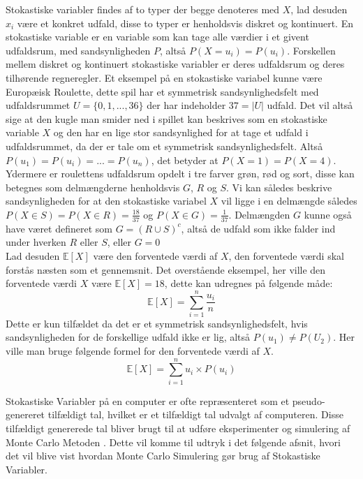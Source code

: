 \documentclass[../../SRP.tex]{subfiles}
\begin{document}
Stokastiske variabler findes af to typer der begge denoteres med $X$, lad desuden $x_i$ være et konkret udfald, disse to typer er henholdsvis diskret og kontinuert. En stokastiske variable er en variable som kan tage alle værdier i et givent udfaldsrum, med sandsynligheden $P$, altså $P(X = u_i) = P(u_i)$. Forskellen mellem diskret og kontinuert stokastiske variabler er deres udfaldsrum og deres tilhørende regneregler. Et eksempel på en stokastiske variabel kunne være Europæisk Roulette, dette spil har et symmetrisk sandsynlighedsfelt med udfaldsrummet $U = \{ 0,1,...,36\}$ der har indeholder $37 = |U|$ udfald. Det vil altså sige at den kugle man smider ned i spillet kan beskrives som en stokastiske variable $X$ og den har en lige stor sandsynlighed for at tage et udfald i udfaldsrummet, da der er tale om et symmetrisk sandsynlighedsfelt. Altså $P(u_1) = P(u_i) = ... = P(u_n)$, det betyder at $P(X = 1) = P(X = 4)$. Ydermere er roulettens udfaldsrum opdelt i tre farver grøn, rød og sort, disse kan betegnes som delmængderne henholdsvis $G$, $R$ og $S$. Vi kan således beskrive sandsynligheden for at den stokastiske variabel $X$ vil ligge i en delmængde således $P(X \in S) = P(X \in R) = \frac{18}{37}$ og $P(X \in G) = \frac{1}{37}$. Delmængden $G$ kunne også have været defineret som $G = (R \cup S)^c$, altså de udfald som ikke falder ind under hverken $R$ eller $S$, eller $G = 0$ \cite{NM} \\

Lad desuden $\mathbb{E}[X]$ være den forventede værdi af $X$, den forventede værdi skal forstås næsten som et gennemsnit. Det overstående eksempel, her ville den forventede værdi $X$ være $\mathbb{E}[X] = 18$, dette kan udregnes på følgende måde:
\begin{equation}
  \mathbb{E}[X] = \sum_{i = 1}^n \frac{u_i}{n}
\end{equation}
Dette er kun tilfældet da det er et symmetrisk sandsynlighedsfelt, hvis sandsynligheden for de forskellige udfald ikke er lig, altså  $P(u_1) \neq P(U_2)$. Her ville man bruge følgende formel for den forventede værdi af $X$.
\begin{equation}
  \mathbb{E}[X] = \sum_{i = 1}^n u_i \times P(u_i)
\end{equation}

Stokastiske Variabler på en computer er ofte repræsenteret som et pseudo-genereret tilfældigt tal, hvilket er et tilfældigt tal udvalgt af computeren. Disse tilfældigt genererede tal bliver brugt til at udføre eksperimenter og simulering af Monte Carlo Metoden \cite{SBM}. Dette vil komme til udtryk i det følgende afsnit, hvori det vil blive vist hvordan Monte Carlo Simulering gør brug af Stokastiske Variabler. 
\end{document}
